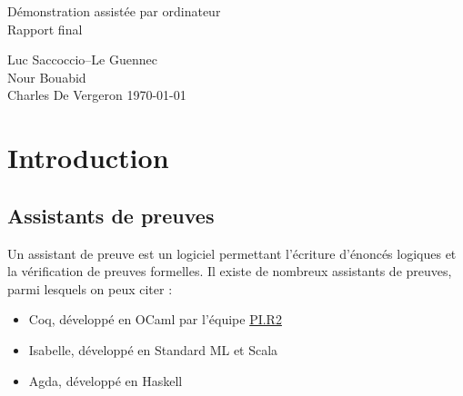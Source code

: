 \documentclass[a4paper, 12pt]{article}
\begin{document}
\begin{titlepage}

    \begin{figure}
        \centering
        \vspace{8cm}
    \end{figure}

    \vspace{6cm}

    \begin{center}
        {\Huge Démonstration assistée par ordinateur\\}
        \vspace{0.5cm}
        {\huge Rapport final\\}

        \vspace{1.5cm}

        {\large Luc Saccoccio--Le Guennec\\ Nour Bouabid\\ Charles De Vergeron}
        \vfill
        {\large \today}
        \pagebreak
    \end{center}

\end{titlepage}

\tableofcontents

\newpage

\section{Introduction}

\subsection{Assistants de preuves}

Un assistant de preuve est un logiciel permettant l'écriture d'énoncés logiques et la vérification de preuves formelles. Il existe de nombreux assistants de preuves, parmi lesquels on peux citer :

\begin{itemize}
    \item Coq, développé en OCaml par l'équipe \href{http://www.pps.univ-paris-diderot.fr/pi.r2/}{PI.R2}
    \item Isabelle, développé en Standard ML et Scala
    \item Agda, développé en Haskell
\end{itemize}
\end{document}
